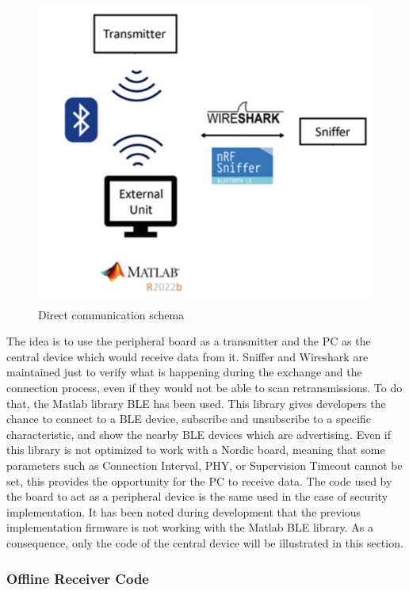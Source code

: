 \documentclass{Configuration_Files/PoliMi3i_thesis}
\begin{document}
\begin{figure}[H]
    \centering
    \includegraphics[scale=0.6]{Board Windows PC/1.png}
    \caption{Direct communication schema}
    \label{boardwindows_1}
\end{figure}

The idea is to use the peripheral board as a transmitter and the PC as the central device which would receive data from it. Sniffer and Wireshark are maintained just to verify what is happening during the exchange and the connection process, even if they would not be able to scan retransmissions. To do that, the Matlab library BLE has been used. This library gives developers the chance to connect to a BLE device, subscribe and unsubscribe to a specific characteristic, and show the nearby BLE devices which are advertising. Even if this library is not optimized to work with a Nordic board, meaning that some parameters such as Connection Interval, PHY, or Supervision Timeout cannot be set, this provides the opportunity for the PC to receive data. The code used by the board to act as a peripheral device is the same used in the case of security implementation. It has been noted during development that the previous implementation firmware is not working with the Matlab BLE library. As a consequence, only the code of the central device will be illustrated in this section.

\subsubsection{Offline Receiver Code}
\end{document}
